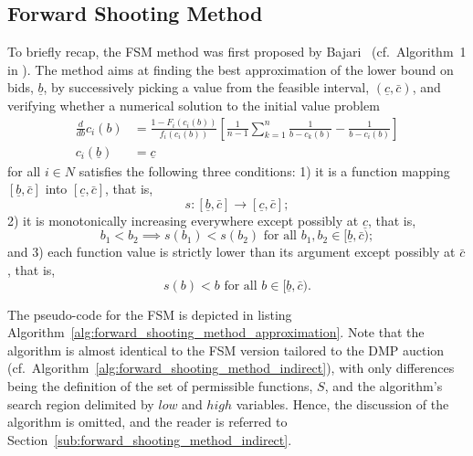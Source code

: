 \subsection{Forward Shooting Method} %
\label{sub:forward_shooting_method}
To briefly recap, the FSM method was first proposed by Bajari~\cite{Bajari2001a} (cf.~Algorithm~1 in \cite{Bajari2001a}). The method aims at finding the best approximation of the lower bound on bids, $\underline{b}$, by successively picking a value from the feasible interval, $(\underline{c}, \bar{c})$, and verifying whether a numerical solution to the initial value problem
\begin{equation}
  \label{eq:fsm_initial_value_problem_approximation}
  \begin{array}{ll}
     \displaystyle\frac{d}{db}c_i(b) &= \displaystyle\frac{1 - F_i(c_i(b))}{f_i(c_i(b))}\left[ \frac{1}{n-1}\sum_{k=1}^n \frac{1}{b-c_k(b)} - \frac{1}{b-c_i(b)} \right]\\[2ex]
    c_i(\underline{b}) &= \underline{c}
  \end{array}
\end{equation}
for all $i\in N$ satisfies the following three conditions: 1) it is a function mapping $[\underline{b}, \bar{c}]$ into $[\underline{c}, \bar{c}]$, that is,
\begin{equation}
  \label{eq:fsm_condition_1_approximation}
    s: [\underline{b}, \bar{c}]\to [\underline{c}, \bar{c}];
\end{equation}
2) it is monotonically increasing everywhere except possibly at $\underline{c}$, that is,
\begin{equation}
  \label{eq:fsm_condition_2_approximation}
  b_1 < b_2\implies s(b_1) < s(b_2) \text{ for all }b_1,b_2\in [\underline{b}, \bar{c});
\end{equation}
and 3) each function value is strictly lower than its argument except possibly at $\bar{c}$, that is,
\begin{equation}
  \label{eq:fsm_condition_3_approximation}
  s(b) < b \text{ for all }b\in [\underline{b}, \bar{c}).
\end{equation}

The pseudo-code for the FSM is depicted in listing Algorithm~\ref{alg:forward_shooting_method_approximation}. Note that the algorithm is almost identical to the FSM version tailored to the DMP auction (cf.~Algorithm~\ref{alg:forward_shooting_method_indirect}), with only differences being the definition of the set of permissible functions, $S$, and the algorithm's search region delimited by $low$ and $high$ variables. Hence, the discussion of the algorithm is omitted, and the reader is referred to Section~\ref{sub:forward_shooting_method_indirect}.


